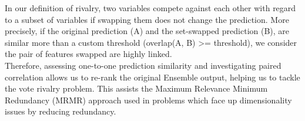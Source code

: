 In our definition of rivalry, two variables compete against each other with regard to a subset of variables if swapping them does not change the prediction.
More precisely, if the original prediction (A) and the set-swapped prediction (B), are similar more than a custom threshold (overlap(A, B) >= threshold), we consider the pair of features swapped are highly linked.
\\

Therefore, assessing one-to-one prediction similarity and investigating paired correlation allows us to re-rank the original Ensemble output, helping us to tackle the vote rivalry problem. This assists the Maximum Relevance Minimum Redundancy (MRMR) \cite{Auffarth2010ComparisonImages}\cite{Peng2005FeatureMin-Redundancy} approach used in problems which face up dimensionality issues by reducing redundancy.